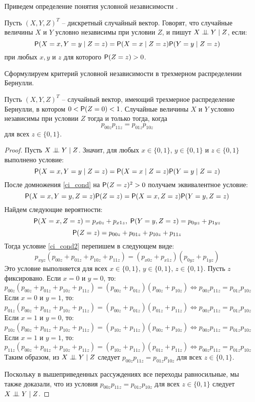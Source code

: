 Приведем определение понятия условной независимости \cite{Lauritzen1996}.
\begin{definition}\label{cond_ind_def}
    Пусть $(X,Y,Z)^T$ -- дискретный случайный вектор.
    Говорят, что случайные величины $X$ и $Y$ условно независимы при условии $Z$,
    и пишут $X \perp\!\!\!\perp Y \mid Z$, если:
    $$
    \mathsf{P}(X=x, Y=y \mid Z = z) = \mathsf{P}(X=x \mid Z = z) \mathsf{P}(Y=y \mid Z = z)
    $$
    при любых $x,y$ и $z$ для которого $\mathsf{P}(Z=z)>0$.
\end{definition}
Сформулируем критерий условной независимости в трехмерном
распределении Бернулли.
\begin{theorem}\label{thm1}
    Пусть $(X,Y,Z)^T$ -- случайный вектор, имеющий трехмерное распределение Бернулли, в котором $0<\mathsf{P}(Z=0)<1$.
    Случайные величины $X$ и $Y$ условно независимы при условии $Z$ тогда и только тогда, когда
    $$p_{00z}p_{11z}=p_{01z}p_{10z}$$ для всех $z\in \{0,1\}$.
\end{theorem}
\begin{proof}
    Пусть $X \perp\!\!\!\perp Y \mid Z$. Значит, для любых $x\in \{0,1\}$, $y\in \{0,1\}$ и $z\in \{0,1\}$ выполнено условие:
    \begin{equation}\label{ci_cond}
        \mathsf{P}(X=x, Y=y \mid Z = z) = \mathsf{P}(X=x \mid Z = z) \mathsf{P}(Y=y \mid Z = z)
    \end{equation}
    После домножения \eqref{ci_cond} на $\mathsf{P}(Z=z)^2>0$ получаем эквивалентное условие:
    \begin{equation}\label{ci_cond2}
        \mathsf{P}(X=x,Y=y,Z=z)\mathsf{P}(Z=z)=\mathsf{P}(X=x,Z=z)\mathsf{P}(Y=y,Z=z)
    \end{equation}
    Найдем следующие вероятности:
    $$
        \mathsf{P}(X=x, Z=z) = p_{x0z} + p_{x1z},\;  \mathsf{P}(Y=y, Z=z) = p_{0yz} + p_{1yz}
    $$
    $$
        \mathsf{P}(Z=z)= p_{00z} + p_{01z} + p_{10z} + p_{11z}
    $$
    Тогда условие \eqref{ci_cond2} перепишем в следующем виде:
    $$
        p_{xyz} (p_{00z} + p_{01z} + p_{10z} + p_{11z}) = (p_{x0z} + p_{x1z}) (p_{0yz} + p_{1yz})
    $$
    Это условие выполняется для всех $x \in \{0,1\}$, $y\in \{0,1\}$, $z\in \{0,1\}$.
    Пусть $z$ фиксировано.
    Если $x=0$ и $y=0$, то:
    $$
        p_{00z} (p_{00z} + p_{01z} + p_{10z} + p_{11z}) = (p_{00z} + p_{01z}) (p_{00z} + p_{10z})
    \Leftrightarrow
        p_{00z} p_{11z} = p_{01z} p_{10z}
    $$
    Если $x=0$ и $y=1$, то:
    $$
        p_{01z} (p_{00z} + p_{01z} + p_{10z} + p_{11z}) = (p_{00z} + p_{01z}) (p_{01z} + p_{11z})
    \Leftrightarrow
    p_{00z} p_{11z} = p_{01z} p_{10z}
    $$
    Если $x=1$ и $y=0$, то:
    $$
        p_{10z} (p_{00z} + p_{01z} + p_{10z} + p_{11z}) = (p_{10z} + p_{11z}) (p_{00z} + p_{10z})
    \Leftrightarrow
    p_{00z} p_{11z} = p_{01z} p_{10z}
    $$
    Если $x=1$ и $y=1$, то:
    $$
        p_{11z} (p_{00z} + p_{01z} + p_{10z} + p_{11z}) = (p_{10z} + p_{11z}) (p_{01z} + p_{11z})
    \Leftrightarrow
    p_{00z} p_{11z} = p_{01z} p_{10z}
    $$
    Таким образом, из $X \perp\!\!\!\perp Y \mid Z$ следует
    $p_{00z}p_{11z}=p_{01z}p_{10z}$ для всех $z \in \{0,1\}$.

    Поскольку в вышеприведенных рассуждениях все переходы равносильные,
    мы также доказали, что из условия $p_{00z}p_{11z}=p_{01z}p_{10z}$ для всех $z \in \{0,1\}$
    следует $X \perp\!\!\!\perp Y \mid Z$.
\end{proof}

